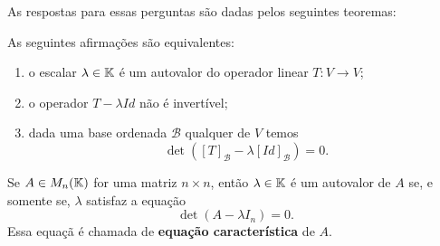 As respostas para essas perguntas são dadas pelos seguintes teoremas:

\begin{teorema}
    As seguintes afirma\c{c}ões são equivalentes:
    \begin{enumerate}
        \item o escalar $\lambda \in \mathbb{K}$ é um autovalor do operador linear $T \colon V \to V$;

        \item o operador $T - \lambda Id$ não é invertível;

        \item dada uma base ordenada $\mathcal{B}$ qualquer de $V$ temos
            \[
                \det([T]_\mathcal{B} - \lambda[Id]_\mathcal{B}) = 0.
            \]
    \end{enumerate}
\end{teorema}

\begin{teorema}
    Se $A \in M_n(\mathbb{K})$ for uma matriz $n \times n$, então $\lambda \in \mathbb{K}$ é um autovalor de $A$ se, e somente se, $\lambda$ satisfaz a equa\c{c}ão
    \[
        \det(A - \lambda I_n) = 0.
    \]
    Essa equa\c{c}ã é chamada de \textbf{equa\c{c}ão característica} de $A$.
\end{teorema}

